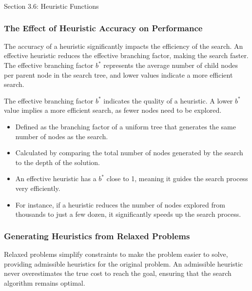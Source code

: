 \begin{notes}{Section 3.6: Heuristic Functions}
\begin{highlight}
    \end{highlight}
    
    \subsubsection*{The Effect of Heuristic Accuracy on Performance}
    
    The accuracy of a heuristic significantly impacts the efficiency of the search. An effective heuristic reduces the effective branching factor, making the search faster. The effective branching 
    factor \(b^*\) represents the average number of child nodes per parent node in the search tree, and lower values indicate a more efficient search.
    
    \begin{highlight}
    
    The effective branching factor \(b^*\) indicates the quality of a heuristic. A lower \(b^*\) value implies a more efficient search, as fewer nodes need to be explored.
    
    \begin{itemize}
        \item Defined as the branching factor of a uniform tree that generates the same number of nodes as the search.
        \item Calculated by comparing the total number of nodes generated by the search to the depth of the solution.
        \item An effective heuristic has a \(b^*\) close to 1, meaning it guides the search process very efficiently.
        \item For instance, if a heuristic reduces the number of nodes explored from thousands to just a few dozen, it significantly speeds up the search process.
    \end{itemize}
    
    \end{highlight}
    
    \subsubsection*{Generating Heuristics from Relaxed Problems}
    
    Relaxed problems simplify constraints to make the problem easier to solve, providing admissible heuristics for the original problem. An admissible heuristic never overestimates the true cost to 
    reach the goal, ensuring that the search algorithm remains optimal.
    

\end{notes}
